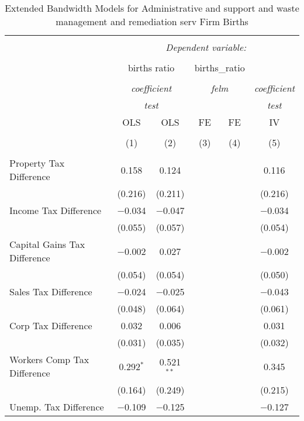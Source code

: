 
\begin{table}[!htbp] \centering 
  \caption{Extended Bandwidth Models for  Administrative and support and waste management and remediation serv Firm Births} 
  \label{} 
\begin{tabular}{@{\extracolsep{5pt}}lccccc} 
\\[-1.8ex]\hline 
\hline \\[-1.8ex] 
 & \multicolumn{5}{c}{\textit{Dependent variable:}} \\ 
\cline{2-6} 
\\[-1.8ex] & \multicolumn{2}{c}{births ratio} & \multicolumn{2}{c}{births\_ratio} &   \\ 
\\[-1.8ex] & \multicolumn{2}{c}{\textit{coefficient}} & \multicolumn{2}{c}{\textit{felm}} & \textit{coefficient} \\ 
 & \multicolumn{2}{c}{\textit{test}} & \multicolumn{2}{c}{\textit{}} & \textit{test} \\ 
 & OLS & OLS & FE & FE & IV \\ 
\\[-1.8ex] & (1) & (2) & (3) & (4) & (5)\\ 
\hline \\[-1.8ex] 
 Property Tax Difference & 0.158 & 0.124 &  &  & 0.116 \\ 
  & (0.216) & (0.211) &  &  & (0.216) \\ 
  Income Tax Difference & $-$0.034 & $-$0.047 &  &  & $-$0.034 \\ 
  & (0.055) & (0.057) &  &  & (0.054) \\ 
  Capital Gains Tax Difference & $-$0.002 & 0.027 &  &  & $-$0.002 \\ 
  & (0.054) & (0.054) &  &  & (0.050) \\ 
  Sales Tax Difference & $-$0.024 & $-$0.025 &  &  & $-$0.043 \\ 
  & (0.048) & (0.064) &  &  & (0.061) \\ 
  Corp Tax Difference & 0.032 & 0.006 &  &  & 0.031 \\ 
  & (0.031) & (0.035) &  &  & (0.032) \\ 
  Workers Comp Tax Difference & 0.292$^{*}$ & 0.521$^{**}$ &  &  & 0.345 \\ 
  & (0.164) & (0.249) &  &  & (0.215) \\ 
  Unemp. Tax Difference & $-$0.109 & $-$0.125 &  &  & $-$0.127 \\ 

\end{tabular}
\end{table}
